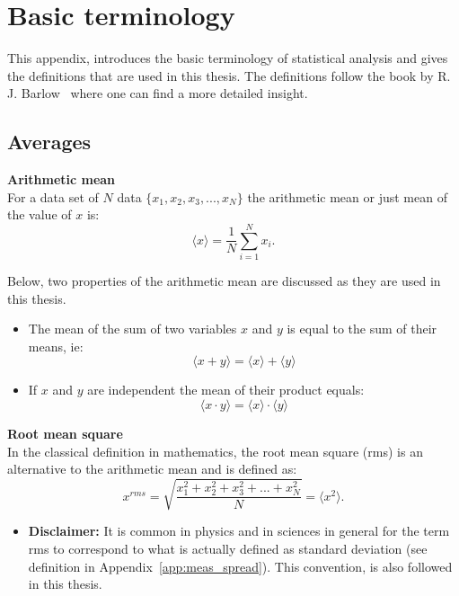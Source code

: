 \section{Basic terminology}\label{app:statistics_definitions}
This appendix, introduces the basic terminology of statistical analysis and gives the definitions that are used in this thesis. The definitions follow the book by R. J. Barlow~\cite{lvp.b313005720130101} where one can find a more detailed insight.

\subsection{Averages}
\normalsize{\textbf{Arithmetic mean}}\\
For a data set of $N$ data $\{ x_1, x_2, x_3, ..., x_N \}$ the arithmetic mean or just mean of the value of $x$ is:
\begin{equation}\label{eq:mean_def}
    \langle x \rangle = \frac{1}{N} \sum_{i=1}^{N} x_i.
\end{equation}

Below, two properties of the arithmetic mean are discussed as they are used in this thesis.
\begin{itemize}
    \item The mean of the sum of two variables $x$ and $y$ is equal to the sum of their means, ie:
    \begin{equation}\label{eq:mean_of_sum_property}
        \langle x+y \rangle = \langle x \rangle + \langle y \rangle
    \end{equation}
    \item If $x$ and $y$ are independent the mean of their product equals:
    \begin{equation}\label{eq:mean_of_product_property}
        \langle x \cdot y \rangle = \langle x \rangle \cdot  \langle y \rangle
    \end{equation}
\end{itemize}


\normalsize{\textbf{Root mean square}}\\
In the classical definition in mathematics, the root mean square (rms) is an alternative to the arithmetic mean and is defined as:
\begin{equation}\label{eq:rms_def}
    x^{rms} = \sqrt{\frac{x_1^2+x_2^2+x_3^2+...+x_N^2}{N}}=\langle x^2 \rangle.
\end{equation}
\begin{itemize}
\item \textbf{Disclaimer:} It is common in physics and in sciences in general for the term rms to correspond to what is actually defined as standard deviation (see definition in Appendix~\ref{app:meas_spread}). This convention, is also followed in this thesis.
\end{itemize}
